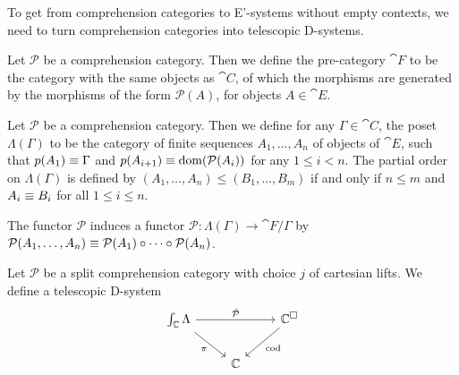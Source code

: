 To get from comprehension categories to E'-systems without empty contexts, we
need to turn comprehension categories into telescopic D-systems. 

\begin{defn}
Let $\mathcal{P}$ be a comprehension category. Then we define the pre-category
$\cat{F}$ to be the category with the same objects as $\cat{C}$, of which the
morphisms are generated by the morphisms of the form $\mathcal{P}(A)$, for objects
$A\in\cat{E}$. 
\end{defn}

\begin{defn}
Let $\mathcal{P}$ be a comprehension category. Then we define for any 
$\Gamma\in\cat{C}$, the poset $\Lambda(\Gamma)$ to be the category of finite 
sequences  $A_1,\ldots,A_n$ of objects of $\cat{E}$, such that 
$p(A_1)\equiv\Gamma$ and $p(A_{i+1})\equiv\mathrm{dom}(\mathcal{P}(A_i))$ 
for any $1\leq i < n$. The partial order on 
$\Lambda(\Gamma)$ is defined by $(A_1,\ldots,A_n)\leq (B_1,\ldots,B_m)$ if and 
only if $n\leq m$ and $A_i\equiv B_i$ for all $1\leq i\leq n$.

The functor $\mathcal{P}$ induces a functor $\mathcal{P}:\Lambda(\Gamma)\to
\cat{F}/\Gamma$ by $\mathcal{P}(A_1,\ldots,A_n)\equiv\mathcal{P}(A_1)\circ
\cdots\circ\mathcal{P}(A_n)$.
\end{defn}

\begin{defn}\label{defn:comp_to_telescopic}
Let $\mathcal{P}$ be a split comprehension category with choice $j$ of cartesian
lifts. We define a telescopic D-system
\begin{equation*}
\begin{tikzcd}
\int_{\cat{C}}\Lambda \arrow[rr,"\bar{\mathcal{P}}"] \arrow[dr,swap,"\pi"] & &
\cat{C}^\square \arrow[dl,"\mathrm{cod}"] \\ & \cat{C}
\end{tikzcd}
\end{equation*}
\end{defn}

